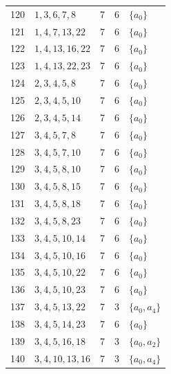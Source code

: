 \begin{longtable}{@{}r l c c l@{}}
120 & $1,3,6,7,8$ & 7 & 6 & $\{a_{0}\}$\\
121 & $1,4,7,13,22$ & 7 & 6 & $\{a_{0}\}$\\
122 & $1,4,13,16,22$ & 7 & 6 & $\{a_{0}\}$\\
123 & $1,4,13,22,23$ & 7 & 6 & $\{a_{0}\}$\\
124 & $2,3,4,5,8$ & 7 & 6 & $\{a_{0}\}$\\
125 & $2,3,4,5,10$ & 7 & 6 & $\{a_{0}\}$\\
126 & $2,3,4,5,14$ & 7 & 6 & $\{a_{0}\}$\\
127 & $3,4,5,7,8$ & 7 & 6 & $\{a_{0}\}$\\
128 & $3,4,5,7,10$ & 7 & 6 & $\{a_{0}\}$\\
129 & $3,4,5,8,10$ & 7 & 6 & $\{a_{0}\}$\\
130 & $3,4,5,8,15$ & 7 & 6 & $\{a_{0}\}$\\
131 & $3,4,5,8,18$ & 7 & 6 & $\{a_{0}\}$\\
132 & $3,4,5,8,23$ & 7 & 6 & $\{a_{0}\}$\\
133 & $3,4,5,10,14$ & 7 & 6 & $\{a_{0}\}$\\
134 & $3,4,5,10,16$ & 7 & 6 & $\{a_{0}\}$\\
135 & $3,4,5,10,22$ & 7 & 6 & $\{a_{0}\}$\\
136 & $3,4,5,10,23$ & 7 & 6 & $\{a_{0}\}$\\
137 & $3,4,5,13,22$ & 7 & 3 & $\{a_{0},a_{4}\}$\\
138 & $3,4,5,14,23$ & 7 & 6 & $\{a_{0}\}$\\
139 & $3,4,5,16,18$ & 7 & 3 & $\{a_{0},a_{2}\}$\\
140 & $3,4,10,13,16$ & 7 & 3 & $\{a_{0},a_{4}\}$\\
\end{longtable}

